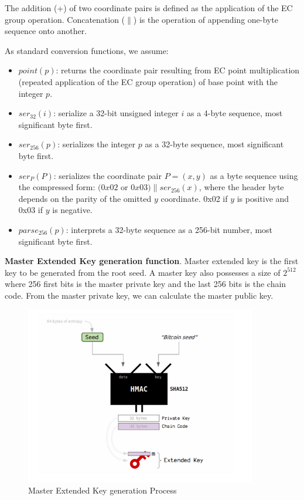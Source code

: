 The addition (+) of two coordinate pairs is defined as the application of the EC group operation. Concatenation ($\parallel$) is the operation of appending one-byte sequence onto another.

As standard conversion functions, we assume:

\begin{itemize}
    \item $point(p)$: returns the coordinate pair resulting from EC point multiplication (repeated application of the EC group operation) of base point with the integer $p$.

    \item $ser_{32}(i)$: serialize a 32-bit unsigned integer $i$ as a 4-byte sequence, most significant byte first.

    \item $ser_{256}(p)$: serializes the integer $p$ as a 32-byte sequence, most significant byte first.
    \item $ser_P(P)$: serializes the coordinate pair $P = (x,y)$ as a byte sequence using the compressed form: $(0x02$ or $0x03) \parallel ser_{256}(x)$, where the header byte depends on the parity of the omitted $y$ coordinate. 0x02 if $y$ is positive and 0x03 if $y$ is negative.
    \item $parse_{256}(p)$: interprets a 32-byte sequence as a 256-bit number, most significant byte first.
\end{itemize}


\bigskip
{\textbf{Master Extended Key generation function}}. Master extended key is the first key to be generated from the root seed. A master key also possesses a size of $2^{512}$ where 256 first bits is the master private key and the last 256 bits is the chain code. From the master private key, we can calculate the master public key.

\begin{figure}[ht!]
    \centering
    \includegraphics[width=0.9\textwidth]{images/masterbip32.png}
    \caption[Master Extended Key generation Process]{Master Extended Key generation Process \cite{learnme}}
    \label{fig:master_bip32}
\end{figure}


